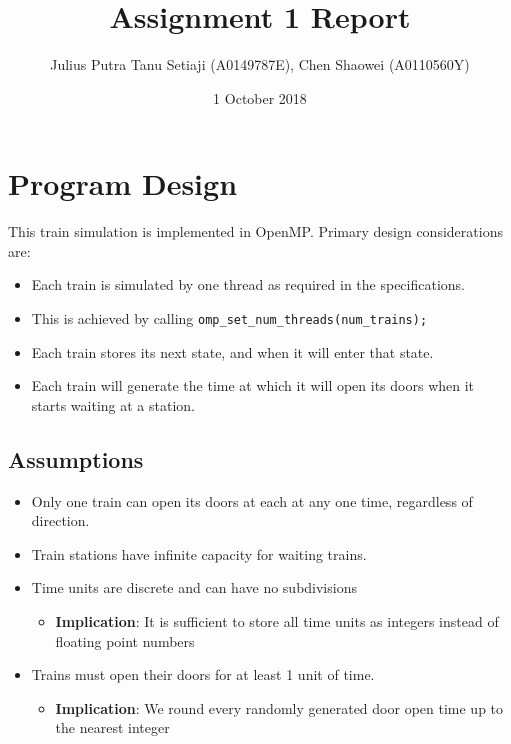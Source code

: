 \documentclass[a4paper,12pt]{article}
\title{Assignment 1 Report}
\author{Julius Putra Tanu Setiaji (A0149787E), Chen Shaowei (A0110560Y)}
\date{1 October 2018}
\begin{document}
	\maketitle
	
	\section{Program Design}
	This train simulation is implemented in OpenMP. Primary design considerations are:
	\begin{itemize}
		\item Each train is simulated by one thread as required in the specifications.
		\item This is achieved by calling \texttt{omp_set_num_threads(num_trains);}
		\item Each train stores its next state, and when it will enter that state.
		\item Each train will generate the time at which it will open its doors when it starts waiting at a station.
	\end{itemize}
	
	\subsection*{Assumptions}
	
	\begin{itemize}
		\item Only one train can open its doors at each at any one time, regardless of direction.
		\item Train stations have infinite capacity for waiting trains.
		\item Time units are discrete and can have no subdivisions
		\begin{itemize}
			\item \textbf{Implication}: It is sufficient to store all time units as integers instead of floating point numbers
		\end{itemize}
		\item Trains must open their doors for at least 1 unit of time.
		\begin{itemize}
			\item \textbf{Implication}: We round every randomly generated door open time up to the nearest integer
  		\end{itemize}
	\end{itemize}
	
\end{document}
